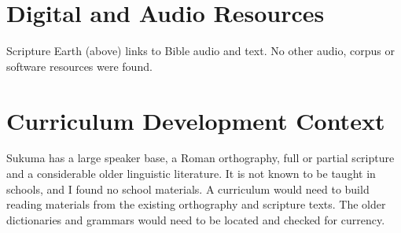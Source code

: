\documentclass[12pt]{article}
\begin{document}
\section{Digital and Audio Resources}
Scripture Earth (above) links to Bible audio and text. No other audio, corpus or software resources were found.

\section{Curriculum Development Context}
Sukuma has a large speaker base, a Roman orthography, full or partial scripture and a considerable older linguistic literature. It is not known to be taught in schools, and I found no school materials. A curriculum would need to build reading materials from the existing orthography and scripture texts. The older dictionaries and grammars would need to be located and checked for currency.
\end{document}
